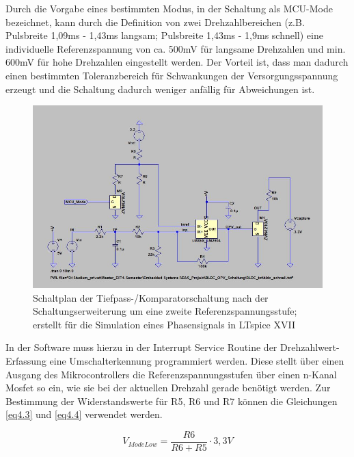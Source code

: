 Durch die Vorgabe eines bestimmten Modus, in der Schaltung als MCU-Mode bezeichnet, kann durch die Definition von zwei Drehzahlbereichen (z.B. Pulsbreite 1,09ms - 1,43ms langsam; Pulsbreite 1,43ms - 1,9ms schnell) eine individuelle Referenzspannung von ca. 500mV für langsame Drehzahlen und min. 600mV für hohe Drehzahlen eingestellt werden. Der Vorteil ist, dass man dadurch einen bestimmten Toleranzbereich für Schwankungen der Versorgungsspannung erzeugt und die Schaltung dadurch weniger anfällig für Abweichungen ist.\vspace{11pt}

\begin{figure}[H] %
\includegraphics[width=.99\textwidth]{sec4/images/Schaltungserweiterung} 
\centering
\captionsetup{width=.95\textwidth}
\caption[Schaltplan der Tiefpass-/Komparatorschaltung nach der Schaltungserweiterung]{Schaltplan der Tiefpass-/Komparatorschaltung nach der Schaltungserweiterung um eine zweite Referenzspannungsstufe; erstellt für die Simulation eines Phasensignals in LTspice XVII}\centering
\label{fig:Schaltungserweiterung}
\end{figure}

In der Software muss hierzu in der Interrupt Service Routine der Drehzahlwert-Erfassung eine Umschalterkennung programmiert werden. Diese stellt über einen Ausgang des Mikrocontrollers die Referenzspannungsstufen über einen n-Kanal Mosfet so ein, wie sie bei der aktuellen Drehzahl gerade benötigt werden. Zur Bestimmung der Widerstandswerte für R5, R6 und R7 können die Gleichungen \ref{eq4.3} und \ref{eq4.4} verwendet werden.\vspace{11pt}

\begin{equation}\label{eq4.3}
V_{ModeLow} = \frac{ R6 }{R6 + R5 }\cdot 3,3V
\end{equation}

